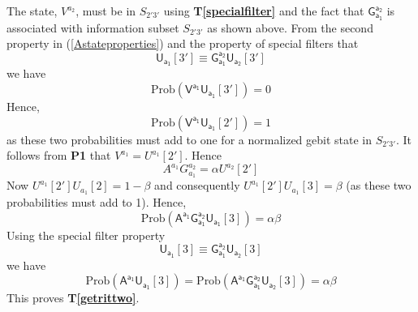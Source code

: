\documentclass[10pt]{article}
\begin{document}
The state, $V^{a_2}$, must be in $S_{2'3'}$ using {\bf T\ref{specialfilter}} and the fact that $\mathsf{G_{a_1}^{a_2}}$ is associated with information subset $S_{2'3'}$ as shown above.  From the second property in (\ref{Astateproperties}) and the property of special filters that
\begin{equation}
\mathsf{U_{a_1}}[3'] \equiv \mathsf{G_{a_1}^{a_2} U_{a_2}}[3']
\end{equation}
we have
\begin{equation}
\text{Prob}(\mathsf{V ^{a_1}U_{a_1}}[3']) =0
\end{equation}
Hence,
\begin{equation}
\text{Prob}(\mathsf{V ^{a_1}U_{a_1}}[2']) =1
\end{equation}
as these two probabilities must add to one for a normalized gebit state in $S_{2'3'}$.   It follows from {\bf P1} that $V^{a_1}=U^{a_1}[2']$.  Hence
\begin{equation}\label{AGU}
A^{a_1} G_{a_1}^{a_2} = \alpha U^{a_2}[2']
\end{equation}
Now $U^{a_1}[2']U_{a_1}[2]=1-\beta $ and consequently $U^{a_1}[2']U_{a_1}[3] = \beta$ (as these two probabilities must add to 1). Hence,
\begin{equation}
\text{Prob}(\mathsf{A^{a_1}G_{a_1}^{a_2}U_{a_1}}[3]) = \alpha\beta
\end{equation}
Using the special filter property
\begin{equation}
\mathsf{U_{a_1}}[3] \equiv \mathsf{G_{a_1}^{a_2} U_{a_2}}[3]
\end{equation}
we have
\begin{equation}
\text{Prob}(\mathsf{A^{a_1}U_{a_1}}[3]) = \text{Prob}(\mathsf{A^{a_1}G_{a_1}^{a_2}U_{a_2}}[3]) =\alpha\beta
\end{equation}
This proves {\bf T\ref{getrittwo}}.

\end{document}
